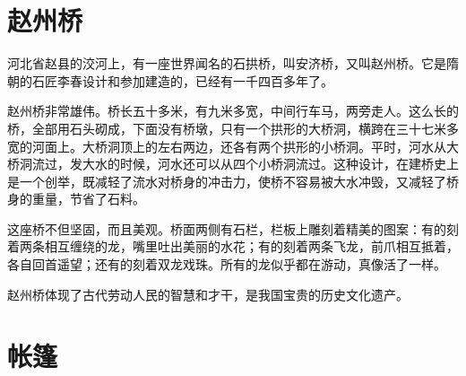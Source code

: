 \documentclass[12pt,UTF-8,openany]{ctexbook}
\begin{document}
\chapter{赵州桥}

\begin{large}
    
    河北省赵县的洨河上，有一座世界闻名的石拱桥，叫安济桥，又叫赵州桥。它是隋朝的石匠李春设计和参加建造的，已经有一千四百多年了。
    
    赵州桥非常雄伟。桥长五十多米，有九米多宽，中间行车马，两旁走人。这么长的桥，全部用石头砌成，下面没有桥墩，只有一个拱形的大桥洞，横跨在三十七米多宽的河面上。大桥洞顶上的左右两边，还各有两个拱形的小桥洞。平时，河水从大桥洞流过，发大水的时候，河水还可以从四个小桥洞流过。这种设计，在建桥史上是一个创举，既减轻了流水对桥身的冲击力，使桥不容易被大水冲毁，又减轻了桥身的重量，节省了石料。
    
    这座桥不但坚固，而且美观。桥面两侧有石栏，栏板上雕刻着精美的图案：有的刻着两条相互缠绕的龙，嘴里吐出美丽的水花；有的刻着两条飞龙，前爪相互抵着，各自回首遥望；还有的刻着双龙戏珠。所有的龙似乎都在游动，真像活了一样。
    
    赵州桥体现了古代劳动人民的智慧和才干，是我国宝贵的历史文化遗产。
    
\end{large}



\chapter{帐篷}
\end{document}
